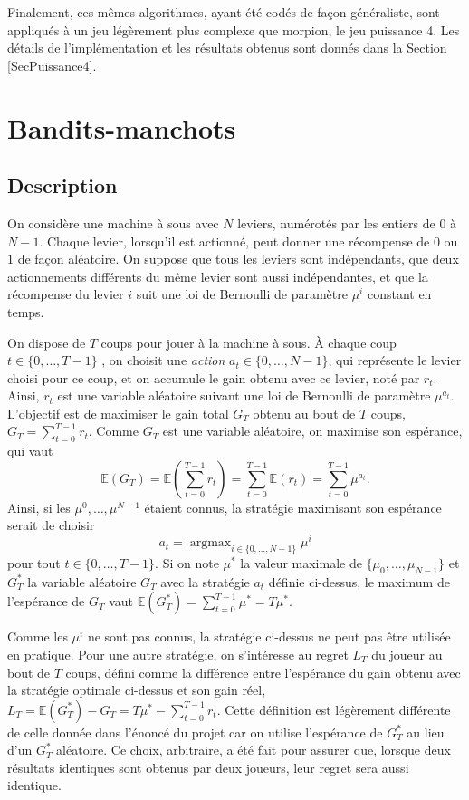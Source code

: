 \documentclass[a4paper,12pt]{article}
\DeclareMathOperator*{\argmax}{argmax}
\begin{document}
Finalement, ces mêmes algorithmes, ayant été codés de façon généraliste, sont appliqués à un jeu légèrement plus complexe que morpion, le jeu puissance 4. Les détails de l'implémentation et les résultats obtenus sont donnés dans la Section \ref{SecPuissance4}.

\section{Bandits-manchots}
\label{SecBM}

\subsection{Description}

On considère une machine à sous avec $N$ leviers, numérotés par les entiers de $0$ à $N-1$. Chaque levier, lorsqu'il est actionné, peut donner une récompense de $0$ ou $1$ de façon aléatoire. On suppose que tous les leviers sont indépendants, que deux actionnements différents du même levier sont aussi indépendantes, et que la récompense du levier $i$ suit une loi de Bernoulli de paramètre $\mu^i$ constant en temps.

On dispose de $T$ coups pour jouer à la machine à sous. À chaque coup $t \in \{0, \dotsc, T-1\}$ , on choisit une \emph{action} $a_t \in \{0, \dotsc, N-1\}$, qui représente le levier choisi pour ce coup, et on accumule le gain obtenu avec ce levier, noté par $r_t$. Ainsi, $r_t$ est une variable aléatoire suivant une loi de Bernoulli de paramètre $\mu^{a_t}$. L'objectif est de maximiser le gain total $G_T$ obtenu au bout de $T$ coups, $G_T = \sum_{t=0}^{T-1} r_t$. Comme $G_T$ est une variable aléatoire, on maximise son espérance, qui vaut
\[
\mathbb E(G_T) = \mathbb E\left(\sum_{t=0}^{T-1} r_t\right) = \sum_{t=0}^{T-1} \mathbb E(r_t) = \sum_{t=0}^{T-1} \mu^{a_t}.
\]
Ainsi, si les $\mu^0, \dotsc, \mu^{N-1}$ étaient connus, la stratégie maximisant son espérance serait de choisir
\[a_t = \argmax_{i \in \{0, \dotsc, N-1\}} \mu^i\]
pour tout $t \in \{0, \dotsc, T-1\}$. Si on note $\mu^\ast$ la valeur maximale de $\{\mu_0, \dotsc, \mu_{N-1}\}$ et $G_T^\ast$ la variable aléatoire $G_T$ avec la stratégie $a_t$ définie ci-dessus, le maximum de l'espérance de $G_T$ vaut $\mathbb E(G_T^\ast) = \sum_{t=0}^{T-1} \mu^\ast = T \mu^\ast$.

Comme les $\mu^i$ ne sont pas connus, la stratégie ci-dessus ne peut pas être utilisée en pratique. Pour une autre stratégie, on s'intéresse au regret $L_T$ du joueur au bout de $T$ coups, défini comme la différence entre l'espérance du gain obtenu avec la stratégie optimale ci-dessus et son gain réel, $L_T = \mathbb E(G_T^\ast) - G_T = T \mu^\ast - \sum_{t=0}^{T-1} r_t$. Cette définition est légèrement différente de celle donnée dans l'énoncé du projet car on utilise l'espérance de $G_T^\ast$ au lieu d'un $G_T^\ast$ aléatoire. Ce choix, arbitraire, a été fait pour assurer que, lorsque deux résultats identiques sont obtenus par deux joueurs, leur regret sera aussi identique.
\end{document}
